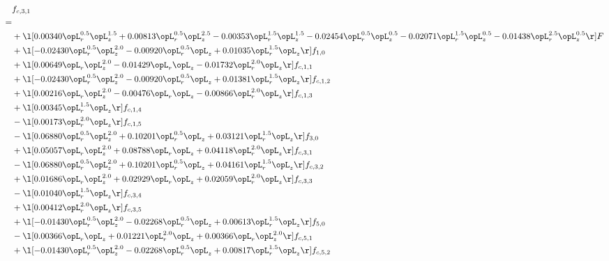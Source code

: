 \begin{alignat}{2} 
\label{eq:f_31_1} 
& f_{c,3,1} \nonumber \\ 
 = \\ 
& + \l[  0.00340 \opL_r^{0.5} \opL_z^{1.5} +  0.00813 \opL_r^{0.5} \opL_z^{2.5}   -0.00353 \opL_r^{1.5} \opL_z^{1.5}   -0.02454 \opL_r^{0.5} \opL_z^{0.5}   -0.02071 \opL_r^{1.5} \opL_z^{0.5}   -0.01438 \opL_r^{2.5} \opL_z^{0.5}  \r] F \nonumber \\ 
& + \l[  -0.02430 \opL_r^{0.5} \opL_z^{2.0}   -0.00920 \opL_r^{0.5} \opL_z +  0.01035 \opL_r^{1.5} \opL_z  \r] f_{1,0} \nonumber \\ 
& + \l[  0.00649 \opL_r \opL_z^{2.0}   -0.01429 \opL_r \opL_z   -0.01732 \opL_r^{2.0} \opL_z  \r] f_{c,1,1} \nonumber \\ 
& + \l[  -0.02430 \opL_r^{0.5} \opL_z^{2.0}   -0.00920 \opL_r^{0.5} \opL_z +  0.01381 \opL_r^{1.5} \opL_z  \r] f_{c,1,2} \nonumber \\ 
& + \l[  0.00216 \opL_r \opL_z^{2.0}   -0.00476 \opL_r \opL_z   -0.00866 \opL_r^{2.0} \opL_z  \r] f_{c,1,3} \nonumber \\ 
& + \l[  0.00345 \opL_r^{1.5} \opL_z  \r] f_{c,1,4} \nonumber \\ 
& - \l[  0.00173 \opL_r^{2.0} \opL_z  \r] f_{c,1,5} \nonumber \\ 
& - \l[  0.06880 \opL_r^{0.5} \opL_z^{2.0} +  0.10201 \opL_r^{0.5} \opL_z +  0.03121 \opL_r^{1.5} \opL_z  \r] f_{3,0} \nonumber \\ 
& + \l[  0.05057 \opL_r \opL_z^{2.0} +  0.08788 \opL_r \opL_z +  0.04118 \opL_r^{2.0} \opL_z  \r] f_{c,3,1} \nonumber \\ 
& - \l[  0.06880 \opL_r^{0.5} \opL_z^{2.0} +  0.10201 \opL_r^{0.5} \opL_z +  0.04161 \opL_r^{1.5} \opL_z  \r] f_{c,3,2} \nonumber \\ 
& + \l[  0.01686 \opL_r \opL_z^{2.0} +  0.02929 \opL_r \opL_z +  0.02059 \opL_r^{2.0} \opL_z  \r] f_{c,3,3} \nonumber \\ 
& - \l[  0.01040 \opL_r^{1.5} \opL_z  \r] f_{c,3,4} \nonumber \\ 
& + \l[  0.00412 \opL_r^{2.0} \opL_z  \r] f_{c,3,5} \nonumber \\ 
& + \l[  -0.01430 \opL_r^{0.5} \opL_z^{2.0}   -0.02268 \opL_r^{0.5} \opL_z +  0.00613 \opL_r^{1.5} \opL_z  \r] f_{5,0} \nonumber \\ 
& - \l[  0.00366 \opL_r \opL_z +  0.01221 \opL_r^{2.0} \opL_z +  0.00366 \opL_r \opL_z^{2.0}  \r] f_{c,5,1} \nonumber \\ 
& + \l[  -0.01430 \opL_r^{0.5} \opL_z^{2.0}   -0.02268 \opL_r^{0.5} \opL_z +  0.00817 \opL_r^{1.5} \opL_z  \r] f_{c,5,2} \nonumber \\ 

\end{alignat}
